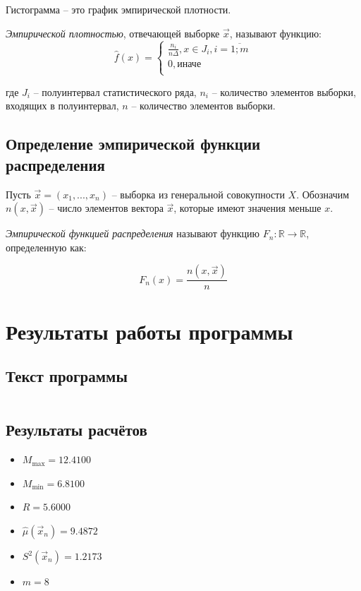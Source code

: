 \documentclass[12pt]{report}
\begin{document}
Гистограмма -- это график эмпирической плотности. 

\textit{Эмпирической плотностью}, отвечающей выборке $\vec x$, называют функцию:
\begin{equation}
	\hat f(x) =
	\begin{cases}
		\frac{n_i}{n \Delta}, x \in J_i, i = \overline{1; m} \\
		0, \text{иначе} \\
	\end{cases}
\end{equation}

где $J_i$ -- полуинтервал статистического ряда, $n_i$ -- количество элементов выборки, входящих в полуинтервал, $n$ -- количество элементов выборки.

\section*{Определение эмпирической функции распределения}

Пусть $\vec x = (x_1, ..., x_n)$ -- выборка из генеральной совокупности $X$. Обозначим $n(x, \vec x)$ -- число элементов вектора $\vec x$, которые имеют значения меньше $x$.

\textit{Эмпирической функцией распределения} называют функцию $F_n: \mathbb{R} \to \mathbb{R}$, определенную как: 

\begin{equation}
	F_n(x) = \frac{n(x, \vec x)}{n}
\end{equation}

\chapter*{Результаты работы программы}

\section*{Текст программы}
\begin{lstlisting}[language=Matlab]

\end{lstlisting}

\section*{Результаты расчётов}

\begin{itemize}
	\item $M_{\max} = 12.4100$
	\item $M_{\min} = 6.8100$
	\item $R = 5.6000$
	\item $\hat\mu(\vec x_n) = 9.4872$
	\item $S^2(\vec x_n) = 1.2173$
	\item $m = 8$
\end{itemize}
\end{document}
